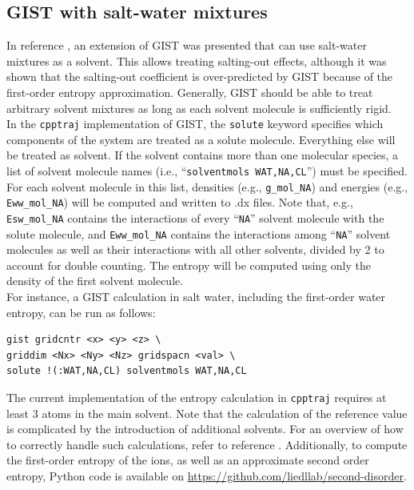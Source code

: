 \documentclass[9pt,tutorial,pubversion]{livecoms}
\newcommand{\software}{\texttt}
\newcommand\inlinecode{\texttt}
\begin{document}
\subsection{GIST with salt-water mixtures}
\label{sec-salt-water}
In reference \cite{Waibl2021-gist-salt}, an extension of GIST was presented that can use salt-water mixtures as a solvent.
This allows treating salting-out effects, although it was shown that the salting-out coefficient is over-predicted by GIST because of the first-order entropy approximation.
Generally, GIST should be able to treat arbitrary solvent mixtures as long as each solvent molecule is sufficiently rigid. \\
In the \software{cpptraj} implementation of GIST, the \inlinecode{solute} keyword specifies which components of the system are treated as a solute molecule.
Everything else will be treated as solvent.
If the solvent contains more than one molecular species, a list of solvent molecule names (i.e., ``\inlinecode{solventmols WAT,NA,CL}'') must be specified.
For each solvent molecule in this list, densities (e.g., \inlinecode{g\_mol\_NA}) and energies (e.g., \inlinecode{Eww\_mol\_NA}) will be computed and written to .dx files.
Note that, e.g., \inlinecode{Esw\_mol\_NA} contains the interactions of every ``\inlinecode{NA}'' solvent molecule with the solute molecule, and \inlinecode{Eww\_mol\_NA} contains the interactions among ``\inlinecode{NA}'' solvent molecules as well as their interactions with all other solvents, divided by 2 to account for double counting.
The entropy will be computed using only the density of the first solvent molecule. \\
For instance, a GIST calculation in salt water, including the first-order water entropy, can be run as follows:

\begin{lstlisting}[style=cpptraj]
gist gridcntr <x> <y> <z> \
griddim <Nx> <Ny> <Nz> gridspacn <val> \
solute !(:WAT,NA,CL) solventmols WAT,NA,CL
\end{lstlisting}
The current implementation of the entropy calculation in \software{cpptraj} requires at least 3 atoms in the main solvent.
Note that the calculation of the reference value is complicated by the introduction of additional solvents.
For an overview of how to correctly handle such calculations, refer to reference \cite{Waibl2021-gist-salt}.
Additionally, to compute the first-order entropy of the ions, as well as an approximate second order entropy, Python code is available on \url{https://github.com/liedllab/second-disorder}.
\end{document}
